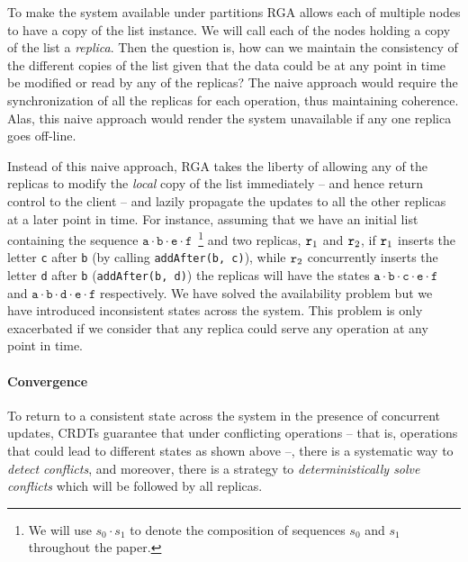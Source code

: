 To make the system available under partitions RGA allows each of
multiple nodes to have a copy of the list instance.
%
We will call each of the nodes holding a copy of the list a \emph{replica}.
%
Then the question is, how can we maintain the consistency of the
different copies of the list given that the data could be at any point
in time be modified or read by any of the replicas?
%
The naive approach would require the synchronization of all the
replicas for each operation, thus maintaining coherence.
%
Alas, this naive approach would render the system unavailable if any
one replica goes off-line.
%

Instead of this naive approach, RGA takes the liberty of allowing any
of the replicas to modify the \emph{local} copy of the list immediately --
and hence return control to the client -- and lazily propagate the
updates to all the other replicas at a later point in time.
%
For instance, assuming that we have an initial list containing the
sequence $\mathtt{a \cdot b \cdot e \cdot f}$~\footnote{We will use
  $s_0 \cdot s_1$ to denote the composition of sequences $s_0$ and
  $s_1$ throughout the paper.}
and two replicas, $\mathtt{r}_1$ and $\mathtt{r}_2$, if $\mathtt{r}_1$ inserts the
letter \lstinline|c| after \lstinline|b| (by calling
\lstinline|addAfter(b, c)|), while $\mathtt{r}_2$ concurrently inserts the
letter \lstinline|d| after \lstinline|b| (\lstinline|addAfter(b, d)|)
the replicas will have the states $\mathtt{a \cdot b \cdot c \cdot e
  \cdot f}$ and $\mathtt{a \cdot b \cdot d \cdot e \cdot f}$
respectively.
%
We have solved the availability problem but we have introduced
inconsistent states across the system.
%
This problem is only exacerbated if we consider that any replica could
serve any operation at any point in time.

\paragraph{Convergence}

To return to a consistent state across the system in the presence of
concurrent updates, CRDTs guarantee that under conflicting operations --
that is, operations that could lead to different states as shown above
--, there is a systematic way to \emph{detect conflicts}, and moreover, there
is a strategy to \emph{deterministically solve conflicts} which will be followed
by all replicas.


